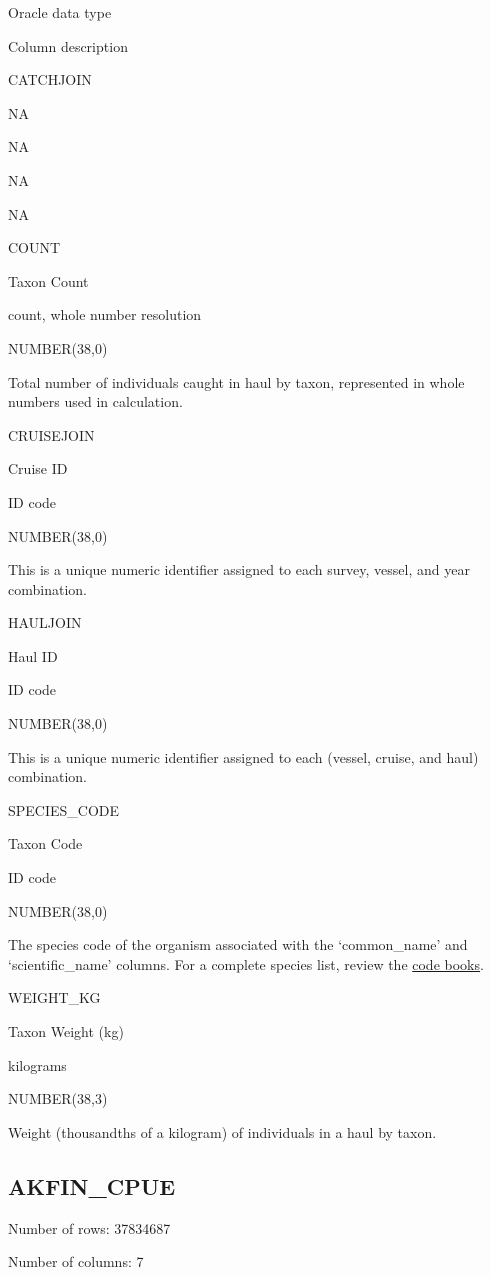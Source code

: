 \documentclass[
  letterpaper,
  oneside,
  open=any]{scrbook}
\begin{document}
Oracle data type

Column description

CATCHJOIN

NA

NA

NA

NA

COUNT

Taxon Count

count, whole number resolution

NUMBER(38,0)

Total number of individuals caught in haul by taxon, represented in
whole numbers used in calculation.

CRUISEJOIN

Cruise ID

ID code

NUMBER(38,0)

This is a unique numeric identifier assigned to each survey, vessel, and
year combination.

HAULJOIN

Haul ID

ID code

NUMBER(38,0)

This is a unique numeric identifier assigned to each (vessel, cruise,
and haul) combination.

SPECIES\_CODE

Taxon Code

ID code

NUMBER(38,0)

The species code of the organism associated with the `common\_name' and
`scientific\_name' columns. For a complete species list, review the
\href{https://www.fisheries.noaa.gov/resource/document/groundfish-survey-species-code-manual-and-data-codes-manual}{code
books}.

WEIGHT\_KG

Taxon Weight (kg)

kilograms

NUMBER(38,3)

Weight (thousandths of a kilogram) of individuals in a haul by taxon.

\hypertarget{akfin_cpue}{%
\subsection{AKFIN\_CPUE}\label{akfin_cpue}}

Number of rows: 37834687

Number of columns: 7
\end{document}

